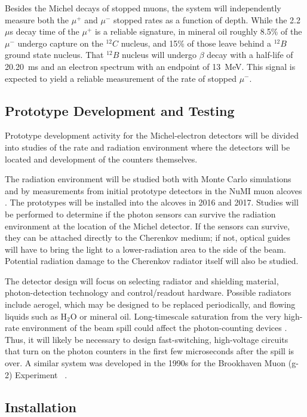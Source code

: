 Besides the Michel decays of stopped muons, the system will
independently measure both the $\mu ^{+}$ and $\mu ^{-}$ stopped
rates as a function of depth. 
While the 2.2~$\mu $s decay time of the $\mu^+$ is a reliable
signature, in mineral oil roughly 8.5\% of the $\mu^{-}$ undergo capture
on the $^{12}C$ nucleus, and 15\% of those leave behind a $^{12}B$
ground state nucleus. That $^{12}B$ nucleus will undergo $\beta$ decay
with a half-life of 20.20~ms and an electron spectrum with an endpoint
of 13~MeV. This signal is expected to yield a reliable measurement of the rate of stopped
$\mu^{-}$.

\subsection{Prototype Development and Testing}

Prototype development activity for the Michel-electron detectors will
be divided into studies of the rate and radiation environment where
the detectors will be located and development of the counters
themselves.

The radiation environment will be studied both with Monte Carlo 
simulations and by measurements from initial prototype detectors 
in the NuMI muon alcoves \cite{ref:NuMIBeamMonitors}.
The prototypes will be installed into the alcoves in 2016 and 2017.
Studies will be performed to determine if the photon sensors
can survive the radiation environment at the location of the Michel
detector. If the sensors can survive, they can be attached directly to
the Cherenkov medium; if not, optical guides will have to bring the
light to a lower-radiation area to the side of the beam. Potential
radiation damage to the Cherenkov radiator itself will also be
studied.

The detector design will focus on selecting radiator and shielding
material, photon-detection technology and control/readout
hardware. Possible radiators include aerogel, which may be designed to
be replaced periodically, and flowing liquids such as H$_2$O or
mineral oil. Long-timescale saturation from the very high-rate
environment of the beam spill could affect the photon-counting devices
\cite{ref:HighRateCounting}. Thus, it will likely be necessary to
design fast-switching, high-voltage circuits that turn on the photon
counters in the first few microseconds after the spill is over. A
similar system was developed in the 1990s for the Brookhaven Muon
(g-2) Experiment~\cite{ref:G2} .

\subsection{Installation}

